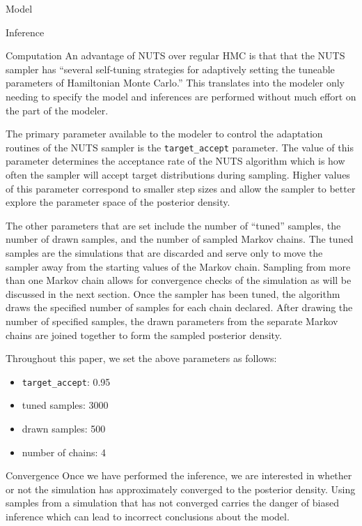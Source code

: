 \begin{chapter}{Model}
\begin{section}{Inference}
\begin{subsection}{Computation}
    An advantage of NUTS over regular HMC is that
    that the NUTS sampler has ``several self-tuning strategies
    for adaptively setting the tuneable parameters of Hamiltonian Monte Carlo.''
    This translates into the modeler only needing to specify the model and inferences are performed
    without much effort on the part of the modeler.

    The primary parameter available to the modeler to control the adaptation
    routines of the NUTS sampler is the \texttt{target\_accept} parameter. The value
    of this parameter determines the acceptance rate of the NUTS algorithm which is how often
    the sampler will accept target distributions during sampling. Higher values of this
    parameter correspond to smaller step sizes and allow the sampler to better explore
    the parameter space of the posterior density.

    The other parameters that are set include the number of ``tuned'' samples, the number of drawn samples,
    and the number of sampled Markov chains. The tuned samples are the simulations
    that are discarded and serve only to move the sampler away from the starting values
    of the Markov chain. Sampling from more than one Markov chain allows for convergence checks of the simulation
    as will be discussed
    in the next section. Once the sampler has been tuned, the algorithm draws the specified number of samples
    for each chain declared. After drawing the number of specified samples, the drawn parameters from the separate
    Markov chains are joined together to form the sampled posterior density.

    Throughout this paper, we set the above parameters as follows:
    \begin{itemize}
      \item \texttt{target\_accept}: 0.95
      \item tuned samples: 3000
      \item drawn samples: 500
      \item number of chains: 4
    \end{itemize}

  \end{subsection}

  \begin{subsection}{Convergence}
    Once we have performed the inference, we
    are interested in whether or not the simulation has approximately converged to
    the posterior density. Using samples from a simulation that has not converged
    carries the danger of biased inference which can lead to incorrect conclusions
    about the model.


\end{subsection}
\end{section}
\end{chapter}
